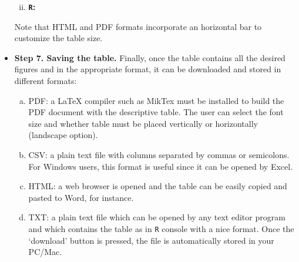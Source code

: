 \documentclass[11pt]{article}
\begin{document}
\begin{itemize}
\begin{enumerate}[i)]
\newpage
	\item {\bf {\tt R}:}
\begin{center}
\end{center}

	\end{enumerate}

\vspace{1cm}
Note that HTML and PDF formats incorporate an horizontal bar to customize the table size.	

\newpage	
\item {\bf Step 7. Saving the table.} Finally, once the table contains all the desired figures and in the appropriate format, it can be downloaded and stored in different formats:

	\begin{enumerate}[a)]
	\item PDF: a \LaTeX{} compiler such as MikTex must be installed to build the PDF document with the descriptive table. The user can select the font size and whether table must be placed vertically or horizontally (landscape option).
	\item CSV: a plain text file with columns separated by commas or semicolons. For Windows users, this format is useful since it can be opened by Excel.
	\item HTML: a web browser is opened and the table can be easily copied and pasted to  Word, for instance.
	\item TXT: a plain text file which can be opened by any text editor program and which contains the table as in {\tt R} console with a nice format. Once the `download' button is pressed, the file is automatically stored in your PC/Mac.	
	\end{enumerate}
	

\end{itemize}
\end{document}
